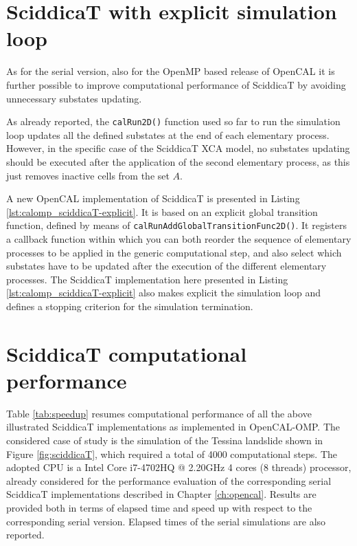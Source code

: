 \section{SciddicaT with explicit simulation loop}

As for the serial version, also for the OpenMP based release of OpenCAL it is
further possible to improve computational performance of SciddicaT by
avoiding unnecessary substates updating.

As already reported, the \verb'calRun2D()' function used so far to
run the simulation loop updates all the defined substates at the end
of each elementary process. However, in the specific case of the
SciddicaT XCA model, no substates updating should be executed after
the application of the second elementary process, as this just removes
inactive cells from the set $A$.

A new OpenCAL implementation of SciddicaT is presented in Listing
\ref{lst:calomp_sciddicaT-explicit}. It is based on an explicit global
transition function, defined by means of
\verb'calRunAddGlobalTransitionFunc2D()'. It registers a callback
function within which you can both reorder the sequence of elementary
processes to be applied in the generic computational step, and also
select which substates have to be updated after the execution of the
different elementary processes. The SciddicaT implementation here
presented in Listing \ref{lst:calomp_sciddicaT-explicit} also
makes explicit the simulation loop and defines a stopping criterion for
the simulation termination.




\section{SciddicaT computational performance}

Table \ref{tab:speedup} resumes computational performance of all the
above illustrated SciddicaT implementations as implemented in
OpenCAL-OMP. The considered case of study is the simulation of the
Tessina landslide shown in Figure \ref{fig:sciddicaT}, which required
a total of 4000 computational steps. The adopted CPU is a Intel Core
i7-4702HQ @ 2.20GHz 4 cores (8 threads) processor, already considered
for the performance evaluation of the corresponding serial SciddicaT
implementations described in Chapter \ref{ch:opencal}. Results are
provided both in terms of elapsed time and speed up with respect to
the corresponding serial version. Elapsed times of the serial
simulations are also reported.

